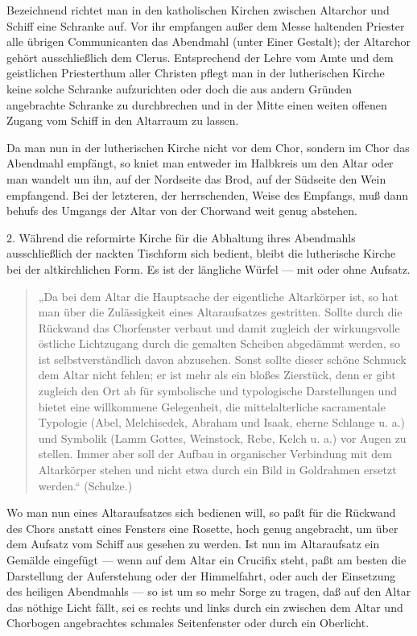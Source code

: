 Bezeichnend richtet man in den katholischen Kirchen zwischen Altarchor und Schiff eine Schranke auf. Vor ihr empfangen außer dem Messe haltenden Priester alle übrigen Communicanten das Abendmahl (unter Einer Gestalt); der Altarchor gehört ausschließlich dem Clerus. Entsprechend der Lehre vom Amte und dem geistlichen Priesterthum aller Christen pflegt man in der lutherischen Kirche keine solche Schranke aufzurichten oder doch die aus andern Gründen angebrachte Schranke zu durchbrechen und in der Mitte einen weiten offenen Zugang vom Schiff in den Altarraum zu lassen.

Da man nun in der lutherischen Kirche nicht vor dem Chor, sondern im Chor das Abendmahl empfängt, so kniet man entweder im Halbkreis um den Altar oder man wandelt um ihn, auf der Nordseite das Brod, auf der Südseite den Wein empfangend. Bei der letzteren, der herrschenden, Weise des Empfangs, muß dann behufs des Umgangs der Altar von der Chorwand weit genug abstehen.

2. Während die reformirte Kirche für die Abhaltung ihres Abendmahls ausschließlich der nackten Tischform sich bedient, bleibt die lutherische Kirche bei der altkirchlichen Form. Es ist der längliche Würfel — mit oder ohne Aufsatz.

\begin{quote}
„Da bei dem Altar die Hauptsache der eigentliche Altarkörper ist, so hat man über die Zulässigkeit eines Altaraufsatzes gestritten. Sollte durch die Rückwand das Chorfenster verbaut und damit zugleich der wirkungsvolle östliche Lichtzugang durch die gemalten Scheiben abgedämmt werden, so ist selbstverständlich davon abzusehen. Sonst sollte dieser schöne Schmuck dem Altar nicht fehlen; er ist mehr als ein bloßes Zierstück, denn er gibt zugleich den Ort ab für symbolische und typologische Darstellungen und bietet eine willkommene Gelegenheit, die mittelalterliche sacramentale Typologie (Abel, Melchisedek, Abraham und Isaak, eherne Schlange u. a.) und Symbolik (Lamm Gottes, Weinstock, Rebe, Kelch u. a.) vor Augen zu stellen. Immer aber soll der Aufbau in organischer Verbindung mit dem Altarkörper stehen und nicht etwa durch ein Bild in Goldrahmen ersetzt werden.“ (Schulze.)
\end{quote}

Wo man nun eines Altaraufsatzes sich bedienen will, so paßt für die Rückwand des Chors anstatt eines Fensters eine Rosette, hoch genug angebracht, um über dem Aufsatz vom Schiff aus gesehen zu werden. Ist nun im Altaraufsatz ein Gemälde eingefügt —
wenn auf dem Altar ein Crucifix steht, paßt am besten die Darstellung der Auferstehung oder der Himmelfahrt, oder auch der Einsetzung des heiligen Abendmahls — so ist um so mehr Sorge zu tragen, daß auf den Altar das nöthige Licht fällt, sei es rechts und links durch ein zwischen dem Altar und Chorbogen angebrachtes schmales Seitenfenster oder durch ein Oberlicht.

